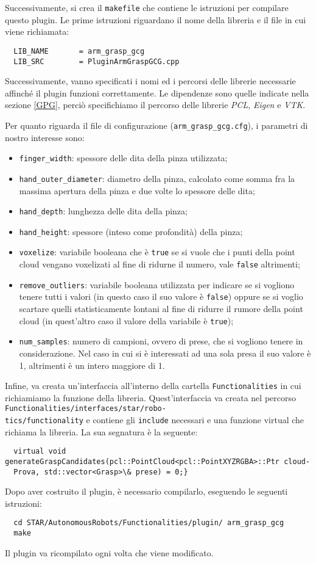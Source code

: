 \documentclass{report}
\begin{document}
\indent Successivamente, si crea il \texttt{makefile} che contiene le istruzioni per compilare questo plugin. Le prime istruzioni riguardano il nome della libreria e il file in cui viene richiamata:
\begin{verbatim}
  LIB_NAME       = arm_grasp_gcg
  LIB_SRC        = PluginArmGraspGCG.cpp
\end{verbatim} 
Successivamente, vanno specificati i nomi ed i percorsi delle librerie necessarie affinché il plugin funzioni correttamente. Le dipendenze sono quelle indicate nella sezione \ref{GPG}, perciò specifichiamo il percorso delle librerie \textit{PCL}, \textit{Eigen} e \textit{VTK}. \par
Per quanto riguarda il file di configurazione (\texttt{arm\_grasp\_gcg.cfg}), i parametri di nostro interesse sono:
\begin{itemize}
\item \texttt{finger\_width}: spessore delle dita della pinza utilizzata;
\item \texttt{hand\_outer\_diameter}: diametro della pinza, calcolato come somma fra la massima apertura della pinza e due volte lo spessore delle dita;
\item \texttt{hand\_depth}: lunghezza delle dita della pinza;
\item \texttt{hand\_height}: spessore (inteso come profondità) della pinza;
\item \texttt{voxelize}: variabile booleana che è \texttt{true} se si vuole che i punti della point cloud vengano voxelizati al fine di ridurne il numero, vale \texttt{false} altrimenti;
\item \texttt{remove\_outliers}: variabile booleana utilizzata per indicare se si vogliono tenere tutti i valori (in questo caso il suo valore è \texttt{false}) oppure se si voglio scartare quelli statisticamente lontani al fine di ridurre il rumore della point cloud (in quest'altro caso il valore della variabile è \texttt{true});
\item \texttt{num\_samples}: numero di campioni, ovvero di prese, che si vogliono tenere in considerazione. Nel caso in cui si è interessati ad una sola presa il suo valore è 1, altrimenti è un intero maggiore di 1.
\end{itemize}
Infine, va creata un'interfaccia all'interno della cartella \texttt{Functionalities} in cui richiamiamo la funzione della libreria. Quest'interfaccia va creata nel percorso \texttt{Functionalities/interfaces/star/robo-}\\\texttt{tics/functionality} e contiene gli \texttt{include} necessari e una funzione virtual che richiama la libreria. La sua segnatura è la seguente:
\begin{verbatim}
  virtual void generateGraspCandidates(pcl::PointCloud<pcl::PointXYZRGBA>::Ptr cloud-
  Prova, std::vector<Grasp>\& prese) = 0;}
\end{verbatim} 
Dopo aver costruito il plugin, è necessario compilarlo, eseguendo le seguenti istruzioni:
\begin{verbatim}
  cd STAR/AutonomousRobots/Functionalities/plugin/ arm_grasp_gcg
  make
\end{verbatim} 
Il plugin va ricompilato ogni volta che viene modificato. 
\end{document}
